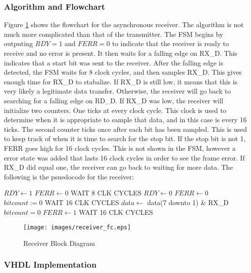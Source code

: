 \documentclass[12pt, a4paper]{article}
\begin{document}
\subsubsection{Algorithm and Flowchart}
Figure \ref{fig:rec_fc} shows the flowchart for the asynchronous receiver. The algorithm is not much more
complicated than that of the transmitter. The FSM begins by outputing $RDY=1$ and $FERR=0$ to indicate that
the receiver is ready to receive and no error is present. It then waits for a falling edge on RX\_D. This
indicates that a start bit was sent to the receiver. After the falling edge is detected, the FSM waits for
8 clock cycles, and then samples RX\_D. This gives enough time for RX\_D to stabalize. If RX\_D is still low,
it means that this is very likely a legitimate data transfer. Otherwise, the receiver will go back to searching
for a falling edge on RD\_D. If RX\_D was low, the receiver will initialize two counters. One ticks at every 
clock cycle. This clock is used to determine when it is appropriate to sample that data, and in this case
is every 16 ticks. The second counter ticks once after each bit has been sampled. This is used to keep
track of when it is time to search for the stop bit. If the stop bit is not 1, FERR goes high for 16 clock cycles.
This is not shown in the FSM, however a error state was added that lasts 16 clock cycles in order to see
the frame error. If RX\_D did equal one, the receiver can go back to waiting for more data. The following is
the psuedocode for the receiver:
\begin{algorithmic}
  \LOOP
    \STATE $RDY \gets 1$
    \STATE $FERR \gets 0$
        \STATE WAIT 8 CLK CYCLES
            \STATE $RDY \gets 0$
            \STATE $FERR \gets 0$
            \STATE $bitcount:=0$
                \STATE WAIT 16 CLK CYCLES
                \STATE $data \gets $ data(7 downto 1) \& RX\_D
                \STATE $bitcount = 0$
            \ENDWHILE
                \STATE $FERR \gets 1$
                \STATE WAIT 16 CLK CYCLES
            \ENDIF
        \ENDIF
    \ENDIF
    \ENDIF
  \ENDLOOP
\end{algorithmic}

\begin{figure}[H]
  \caption{Receiver Block Diagram}
  \centering
  \texttt{[image: images/receiver\_fc.eps]}
  \label{fig:rec_fc}
\end{figure}
\subsubsection{VHDL Implementation}
\lstset{caption=Receiver,label=lst:rec}

\end{document}
